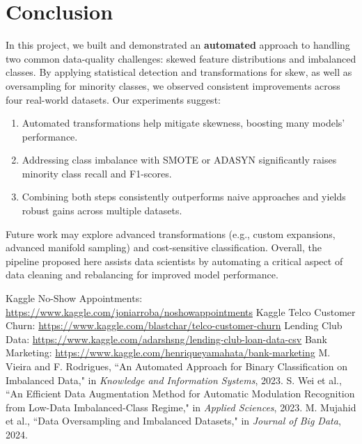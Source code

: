 \documentclass[11pt]{article}
\begin{document}
\section{Conclusion}
In this project, we built and demonstrated an \textbf{automated} approach to handling two common data-quality challenges: skewed feature distributions and imbalanced classes. By applying statistical detection and transformations for skew, as well as oversampling for minority classes, we observed consistent improvements across four real-world datasets. Our experiments suggest:
\begin{enumerate}
    \item Automated transformations help mitigate skewness, boosting many models' performance.
    \item Addressing class imbalance with SMOTE or ADASYN significantly raises minority class recall and F1-scores.
    \item Combining both steps consistently outperforms naive approaches and yields robust gains across multiple datasets.
\end{enumerate}

Future work may explore advanced transformations (e.g., custom expansions, advanced manifold sampling) and cost-sensitive classification. Overall, the pipeline proposed here assists data scientists by automating a critical aspect of data cleaning and rebalancing for improved model performance.


\begin{thebibliography}{9}
 Kaggle No-Show Appointments: \url{https://www.kaggle.com/joniarroba/noshowappointments}
 Kaggle Telco Customer Churn: \url{https://www.kaggle.com/blastchar/telco-customer-churn}
 Lending Club Data: \url{https://www.kaggle.com/adarshsng/lending-club-loan-data-csv}
 Bank Marketing: \url{https://www.kaggle.com/henriqueyamahata/bank-marketing}
 M. Vieira and F. Rodrigues, ``An Automated Approach for Binary Classification on Imbalanced Data," in \textit{Knowledge and Information Systems}, 2023.
 S. Wei et al., ``An Efficient Data Augmentation Method for Automatic Modulation Recognition from Low-Data Imbalanced-Class Regime," in \textit{Applied Sciences}, 2023.
 M. Mujahid et al., ``Data Oversampling and Imbalanced Datasets," in \textit{Journal of Big Data}, 2024.
\end{thebibliography}
\end{document}
